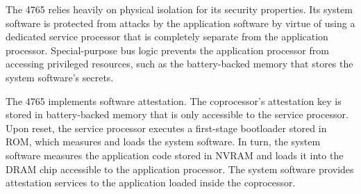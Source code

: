 The 4765 relies heavily on physical isolation for its security properties. Its
system software is protected from attacks by the application software by
virtue of using a dedicated service processor that is completely separate from
the application processor. Special-purpose bus logic prevents the application
processor from accessing privileged resources, such as the battery-backed
memory that stores the system software's secrets.

The 4765 implements software attestation. The coprocessor's attestation key is
stored in battery-backed memory that is only accessible to the service
processor. Upon reset, the service processor executes a first-stage bootloader
stored in ROM, which measures and loads the system software. In turn, the
system software measures the application code stored in NVRAM and loads it into
the DRAM chip accessible to the application processor. The system software
provides attestation services to the application loaded inside the coprocessor.
